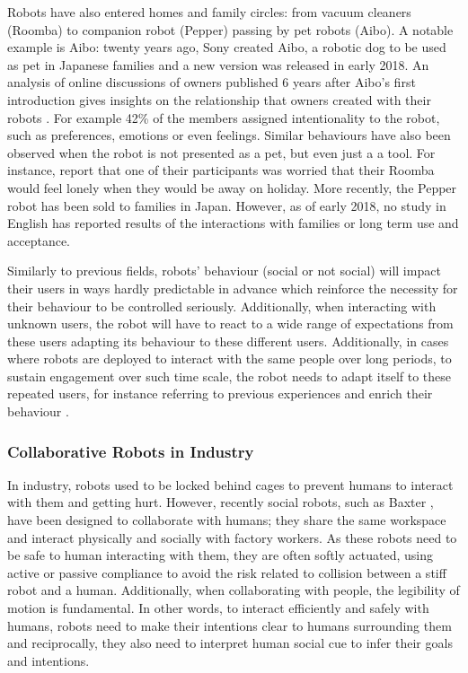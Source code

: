    Robots have also entered homes and family circles: from vacuum cleaners (Roomba) to companion robot (Pepper) passing by pet robots (Aibo). A notable example is Aibo: twenty years ago, Sony created Aibo, a robotic dog to be used as pet in Japanese families and a new version was released in early 2018. An analysis of online discussions of owners published 6 years after Aibo's first introduction gives insights on the relationship that owners created with their robots \citep{friedman2003hardware}. For example 42\% of the members assigned intentionality to the robot, such as preferences, emotions or even feelings. Similar behaviours have also been observed when the robot is not presented as a pet, but even just a a tool. For instance, \cite{fink2013living} report that one of their participants was worried that their Roomba would feel lonely when they would be away on holiday. More recently, the Pepper robot has been sold to families in Japan. However, as of early 2018, no study in English has reported results of the interactions with families or long term use and acceptance.
    
    Similarly to previous fields, robots' behaviour (social or not social) will impact their users in ways hardly predictable in advance which reinforce the necessity for their behaviour to be controlled seriously. Additionally, when interacting with unknown users, the robot will have to react to a wide range of expectations from these users adapting its behaviour to these different users. Additionally, in cases where robots are deployed to interact with the same people over long periods, to sustain engagement over such time scale, the robot needs to adapt itself to these repeated users, for instance referring to previous experiences and enrich their behaviour \citep{leite2013social}.

\subsubsection{Collaborative Robots in Industry}

	In industry, robots used to be locked behind cages to prevent humans to interact with them and getting hurt. However, recently social robots, such as Baxter \citep{guizzo2012rethink}, have been designed to collaborate with humans; they share the same workspace and interact physically and socially with factory workers. As these robots need to be safe to human interacting with them, they are often softly actuated, using active or passive compliance to avoid the risk related to collision between a stiff robot and a human. Additionally, when collaborating with people, the legibility of motion is fundamental. In other words, to interact efficiently and safely with humans, robots need to make their intentions clear to humans surrounding them \citep{dragan2013legibility} and reciprocally, they also need to interpret human social cue to infer their goals and intentions.
	
